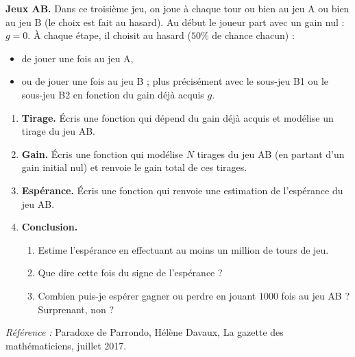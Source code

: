 \documentclass[11pt,class=report,crop=false]{standalone}
\begin{document}


\begin{activite}


\textbf{Jeux AB.} Dans ce troisième jeu, on joue à chaque tour ou bien au jeu A ou bien au jeu B (le choix est fait au hasard). 
Au début le joueur part avec un gain nul : $g=0$. 
\`A chaque étape, il choisit au hasard ($50\%$ de chance chacun) :
\begin{itemize}
  \item de jouer une fois au jeu A,
  \item ou de jouer une fois au jeu B ; plus précisément avec le sous-jeu B1 ou le sous-jeu B2 en fonction du gain déjà acquis $g$.
\end{itemize}

\begin{enumerate}
  \item \textbf{Tirage.}
  \'Ecris une fonction  qui dépend du gain déjà acquis et modélise un tirage du jeu AB.
  
  \item \textbf{Gain.} \'Ecris une fonction  qui modélise $N$ tirages du jeu AB (en partant d'un gain initial nul) et renvoie le gain total de ces tirages.
  
  \item \textbf{Espérance.} \'Ecris une fonction  qui renvoie une estimation de l'espérance du jeu AB.
  
  \item \textbf{Conclusion.}
  \begin{enumerate}
    \item Estime l'espérance en effectuant au moins un million de tours de jeu.
    \item Que dire cette fois du signe de l'espérance ?
    \item Combien puis-je espérer gagner ou perdre en jouant $1000$ fois au jeu AB ? Surprenant, non ?
  \end{enumerate}

\end{enumerate}
\end{activite}


\emph{Référence :} \og{}Paradoxe de Parrondo\fg{}, Hélène Davaux, La gazette des mathématiciens, juillet 2017.
\end{document}

